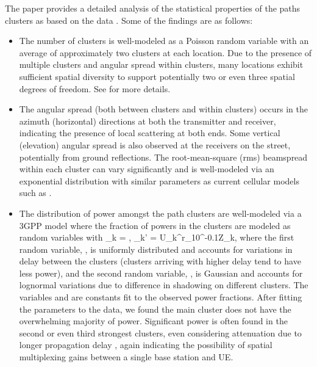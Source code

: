 \documentclass[journal]{IEEEtran}
\def\beq{}
\begin{document}
The paper \cite{AkLiuRanRapEr:13-arxiv} provides a detailed analysis of the
statistical properties of the paths clusters as based
on the data  \cite{rappaportmillimeter,ben2011millimeter,Rappaport:12-28G,Rappaport:28NYCPenetrationLoss,Samimi:AoAD,Nie72G-PIMRC:13,Rappaport:13-BBmmW}.  Some of the findings are as follows:
\begin{itemize}
\item The number of clusters is well-modeled as a Poisson random variable
with an average of approximately two clusters at each location.
Due to the presence of multiple clusters and angular spread within clusters,
many locations exhibit sufficient spatial diversity to support
potentially two or even three spatial degrees of freedom.
See \cite{AkLiuRanRapEr:13-arxiv} for more details.

\item The angular spread (both between clusters and within clusters)
occurs in the azimuth (horizontal) directions at
both the transmitter and receiver, indicating the presence of local scattering
at both ends.  Some vertical (elevation) angular spread is also observed
at the receivers on the street, potentially from ground reflections.
The root-mean-square (rms) beamspread within each cluster can vary
significantly and is well-modeled via an exponential distribution
with similar parameters as current cellular models such as \cite{3GPP36.814}.

\item The distribution of power amongst the path clusters are well-modeled
via a 3GPP model \cite{3GPP36.814} where the fraction of powers in the 
clusters are modeled as random variables  with
\beq \label{eq:powFrac}
    \gamma_k = , \quad
    \gamma_k' = U_k^{r_}10^{-0.1Z_k},
\eeq
where  the first random variable, , is uniformly distributed and
accounts for variations in delay
between the clusters (clusters arriving with higher delay tend to have less power),
and the second random variable, , is Gaussian
and accounts for lognormal variations due to difference in shadowing
on different clusters.  The variables  and  are constants fit
to the observed power fractions.
After fitting the parameters to the data, we found
the main cluster does not have the overwhelming majority of power.  Significant
power is often found in the second or even third strongest clusters,
even considering attenuation due to longer propagation delay \cite{AkLiuRanRapEr:13-arxiv},
again indicating the possibility of spatial multiplexing gains between a single base station
and UE.
\end{itemize}
\end{document}
